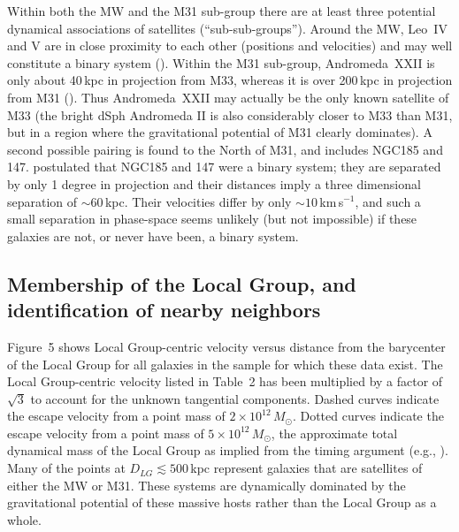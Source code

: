 \documentclass[manuscript]{aastex}
\begin{document}
Within both the MW and the M31 sub-group there are at least three
potential dynamical associations of satellites
(``sub-sub-groups''). Around the MW, Leo~IV and V are in close
proximity to each other (positions and velocities) and may well
constitute a binary system (\citealt{belokurov2008,dejong2010}). Within the M31 sub-group, Andromeda~XXII
is only about 40\,kpc in projection from M33, whereas it is over
200\,kpc in projection from M31 (\citealt{martin2009}). Thus Andromeda~XXII may actually be
the only known satellite of M33 (the bright dSph Andromeda II is also
considerably closer to M33 than M31, but in a region where the
gravitational potential of M31 clearly dominates). A second possible
pairing is found to the North of M31, and includes
NGC185 and 147. %
\cite{vandenbergh1998} postulated
that NGC185 and 147 were a binary system; they are separated by only 1
degree in projection and their distances imply a three dimensional
separation of $\sim 60$\,kpc. Their velocities differ by only
$\sim 10$\,km\,s$^{-1}$, and such a small separation in phase-space seems
unlikely (but not impossible) if these galaxies are not, or never have
been, a binary system. 

\subsection{Membership of the Local Group, and identification of
  nearby neighbors}

Figure~5 shows Local Group-centric velocity versus distance from the
barycenter of the Local Group for all galaxies in the sample for which
these data exist. The Local Group-centric velocity listed in Table~2
has been multiplied by a factor of $\sqrt3$ to account for the unknown
tangential components. Dashed curves indicate the escape velocity from
a point mass of $2 \times 10^{12}\,M_\odot$. Dotted curves indicate
the escape velocity from a point mass of $5 \times 10^{12}\,M_\odot$,
the approximate total dynamical mass of the Local Group as implied from the timing
argument (e.g., \citealt{lyndenbell1981}). Many of the points at
$D_{LG}\lesssim500$\,kpc represent galaxies that are satellites of
either the MW or M31. These systems are dynamically dominated by the gravitational
potential of these massive hosts rather than the Local Group as a
whole. 
\end{document}
